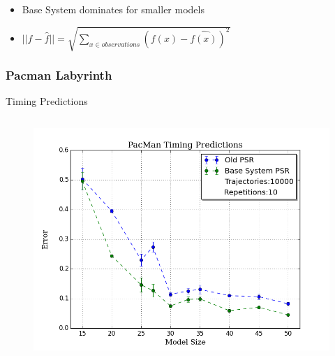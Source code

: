 \documentclass{beamer}
\begin{document}
\begin{frame}
\begin{columns}[c]
\end{columns}

\begin{itemize}
\item Base System dominates for smaller models

\item[] $||f - \hat{f}|| = \sqrt{\sum\nolimits_{x \in observations}(f(x) - \hat{f(x)})^2}$ 
\end{itemize}

\end{frame}



\begin{frame}
\frametitle{Pacman Labyrinth}



\hspace{1cm} Timing Predictions

\begin{columns}[c]

\begin{figure}
\includegraphics[width=1.0\linewidth]{uCOREPICS/PacManTiming.png}
\end{figure}



\end{columns}
\end{frame}
\end{document}
